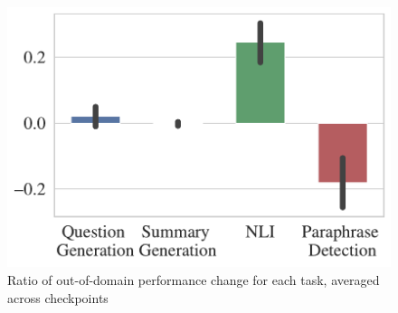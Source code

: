 \begin{figure}[t]
\centering
  \includegraphics[width=0.65\columnwidth]{figures/fig_files/ood/weighted_ood_transfer_bar.pdf}
  \caption{Ratio of out-of-domain performance change for each task, averaged across checkpoints}
  \label{fig:finding:ood-by-data}
\end{figure}
